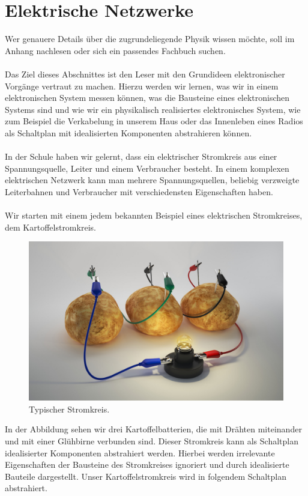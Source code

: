 \documentclass[11pt,a4paper,leqno]{report}
\numberwithin{equation}{chapter}
\begin{document}
\section{Elektrische Netzwerke}
Wer genauere Details \"uber die zugrundeliegende Physik wissen m\"ochte, soll im Anhang nachlesen oder sich ein passendes Fachbuch suchen.\\
\\
Das Ziel dieses Abschnittes ist den Leser mit den Grundideen elektronischer Vorg\"ange vertraut zu machen. Hierzu werden wir lernen, was wir in einem elektronischen System messen k\"onnen, was die Bausteine eines elektronischen Systems sind und wie wir ein physikalisch realisiertes elektronisches System, wie zum Beispiel die Verkabelung in unserem Haus oder das Innenleben eines Radios als Schaltplan mit idealisierten Komponenten abstrahieren k\"onnen.\\
\\
In der Schule haben wir gelernt, dass ein elektrischer Stromkreis aus einer Spannungsquelle, Leiter und einem Verbraucher besteht.
In einem komplexen elektrischen Netzwerk kann man mehrere Spannungsquellen, beliebig verzweigte Leiterbahnen und Verbraucher mit verschiedensten Eigenschaften haben.
\\
\\
Wir starten mit einem jedem bekannten Beispiel eines elektrischen Stromkreises, dem Kartoffelstromkreis.
\begin{figure}[H]
	\begin{center}
		\includegraphics[scale=0.5]{kartoffel.jpg}
		\caption{Typischer Stromkreis.}
	\end{center}
\end{figure}
\noindent
In der Abbildung sehen wir drei Kartoffelbatterien, die mit Dr\"ahten miteinander und mit einer Gl\"uhbirne verbunden sind. Dieser Stromkreis kann als Schaltplan idealisierter Komponenten abstrahiert werden. Hierbei werden irrelevante Eigenschaften der Bausteine des Stromkreises ignoriert und durch idealisierte Bauteile dargestellt. Unser Kartoffelstromkreis wird in folgendem Schaltplan abstrahiert.
\end{document}
